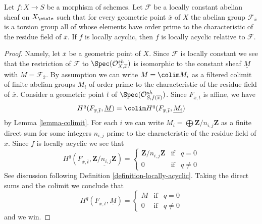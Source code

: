 \begin{lemma}
\label{lemma-locally-acyclic-locally-constant}
Let $f : X \to S$ be a morphism of schemes. Let $\mathcal{F}$ be a
locally constant abelian sheaf on $X_\etale$ such that for every geometric
point $\overline{x}$ of $X$ the abelian group
$\mathcal{F}_{\overline{x}}$ is a torsion group all of whose elements have
order prime to the characteristic of the
residue field of $\overline{x}$. If $f$ is locally acyclic, then $f$ is
locally acyclic relative to $\mathcal{F}$.
\end{lemma}

\begin{proof}
Namely, let $\overline{x}$ be a geometric point of $X$.
Since $\mathcal{F}$ is locally constant we see that
the restriction of $\mathcal{F}$ to $\Spec(\mathcal{O}^{sh}_{X, \overline{x}})$
is isomorphic to the constant sheaf $\underline{M}$ with
$M = \mathcal{F}_{\overline{x}}$. By assumption we can write
$M = \colim M_i$ as a filtered colimit of finite abelian groups
$M_i$ of order prime to the characteristic of the residue field of
$\overline{x}$. Consider a geometric point $\overline{t}$ of
$\Spec(\mathcal{O}^{sh}_{S, f(\overline{x})})$.
Since $F_{\overline{x}, \overline{t}}$ is affine, we have
$$
H^q(F_{\overline{x}, \overline{t}}, \underline{M}) =
\colim H^q(F_{\overline{x}, \overline{t}}, \underline{M_i})
$$
by Lemma \ref{lemma-colimit}.
For each $i$ we can write $M_i = \bigoplus \mathbf{Z}/n_{i, j}\mathbf{Z}$
as a finite direct sum for some integers $n_{i, j}$ prime to the
characteristic of the residue field of $\overline{x}$.
Since $f$ is locally acyclic we see that
$$
H^q(F_{\overline{x}, \overline{t}},
\underline{\mathbf{Z}/n_{i, j}\mathbf{Z}}) =
\left\{
\begin{matrix}
\mathbf{Z}/n_{i, j}\mathbf{Z} & \text{if} & q = 0 \\
0 & \text{if} & q \not = 0
\end{matrix}
\right.
$$
See discussion following Definition \ref{definition-locally-acyclic}.
Taking the direct sums and the colimit we conclude that
$$
H^q(F_{\overline{x}, \overline{t}}, \underline{M}) =
\left\{
\begin{matrix}
M & \text{if} & q = 0 \\
0 & \text{if} & q \not = 0
\end{matrix}
\right.
$$
and we win.
\end{proof}

